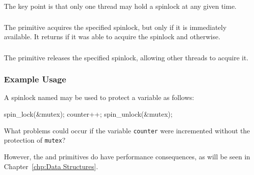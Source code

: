 The key point is that only one thread may hold a spinlock at any
given time.

\subsubsection{}

The  primitive acquires the specified spinlock,
but only if it is immediately available.
It returns  if it was able to acquire the spinlock and
 otherwise.

\subsubsection{}

The  primitive releases the specified spinlock,
allowing other threads to acquire it.


\subsubsection{Example Usage}

A spinlock named  may be used to protect a variable
 as follows:

\begin{VerbatimU}
spin_lock(&mutex);
counter++;
spin_unlock(&mutex);
\end{VerbatimU}

\QuickQuiz{}
	What problems could occur if the variable {\tt counter} were
	incremented without the protection of {\tt mutex}?
 \QuickQuizEnd

However, the  and  primitives
do have performance consequences, as will be seen in
Chapter~\ref{chp:Data Structures}.

